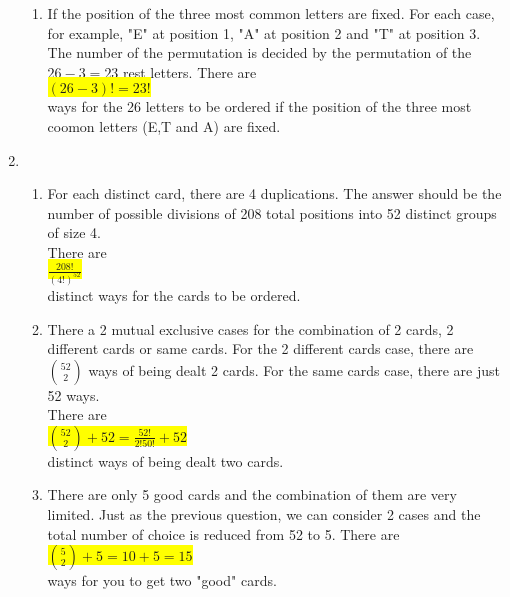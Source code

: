 \documentclass{article}
\begin{document}
\begin{enumerate}
\begin{enumerate}
		\item
		\mysolu
		If the position of the three most common letters are fixed. For each case, for example, "E" at position 1, "A" at position 2 and "T" at position 3. The number of the permutation is decided by the permutation of the ${26 - 3 = 23}$ rest letters.
		\myansw
		There are\\
		\colorbox{yellow}{
			${(26-3)! = 23!}$
		}\\
		ways for the 26 letters to be ordered if the position of the three most coomon letters (E,T and A) are fixed.\\
		
		
	\end{enumerate}

	\item
	\begin{enumerate}
		\item
		\mysolu
		For each distinct card, there are 4 duplications. The answer should be the number of possible divisions of 208 total positions into 52 distinct groups of size 4.\\
		\myansw
		There are\\
		\colorbox{yellow}{
			${\frac{208!}{(4!)^{52}}}$
		}\\
		distinct ways for the cards to be ordered.\\
		
		\item
		\mysolu
		There a 2 mutual exclusive cases for the combination of 2 cards, 2 different cards or same cards. For the 2 different cards case, there are ${{52 \choose 2}}$ ways of being dealt 2 cards. For the same cards case, there are just 52 ways.\\
		\myansw
		There are\\
		\colorbox{yellow}{
			${{52 \choose 2}+52 = \frac{52!}{2!50!}+52}$
		}\\
		distinct ways of being dealt two cards.
		
		\item
		\mysolu
		There are only 5 good cards and the combination of them are very limited. Just as the previous question, we can consider 2 cases and the total number of choice is reduced from 52 to 5.
		\myansw
		There are\\
		\colorbox{yellow}{
			${{5 \choose 2}+5 = 10 + 5 = 15}$
		}\\
		ways for you to get two "good" cards.
		

\end{enumerate}
\end{enumerate}
\end{document}
